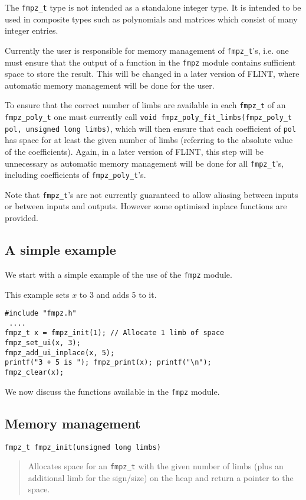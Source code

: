 \documentclass[a4paper,10pt]{article}
\newcommand{\code}{\lstinline}
\begin{document}
The \code{fmpz_t} type is not intended as a standalone integer type. It is intended to be used in composite types such as polynomials and matrices which consist of many integer entries. 

Currently the user is responsible for memory management of \code{fmpz_t}'s, i.e. one must ensure that the output of a function in the \code{fmpz} module contains sufficient space to store the result. This will be changed in a later version of FLINT, where automatic memory management will be done for the user. 

To ensure that the correct number of limbs are available in each \code{fmpz_t} of an \code{fmpz_poly_t} one must currently call \code{void fmpz_poly_fit_limbs(fmpz_poly_t pol, unsigned long limbs)}, which will then ensure that each coefficient of \code{pol} has space for at least the given number of limbs (referring to the absolute value of the coefficients). Again, in a later version of FLINT, this step will be unnecessary as automatic memory management will be done for all \code{fmpz_t}'s, including coefficients of \code{fmpz_poly_t}'s.

Note that \code{fmpz_t}'s are not currently guaranteed to allow aliasing between inputs or between inputs and outputs. However some optimised inplace functions are provided.

\subsection{A simple example}
We start with a simple example of the use of the \code{fmpz} module.

This example sets $x$ to 3 and adds 5 to it.

\begin{lstlisting}
#include "fmpz.h"
 ....
fmpz_t x = fmpz_init(1); // Allocate 1 limb of space
fmpz_set_ui(x, 3);
fmpz_add_ui_inplace(x, 5);
printf("3 + 5 is "); fmpz_print(x); printf("\n");
fmpz_clear(x);
\end{lstlisting}

We now discuss the functions available in the \code{fmpz} module.

\subsection{Memory management}

\begin{lstlisting}
fmpz_t fmpz_init(unsigned long limbs) 
\end{lstlisting}
\begin{quote}
Allocates space for an \code{fmpz_t} with the given number of limbs (plus an additional limb for the sign/size) on the heap and return a pointer to the space.
\end{quote}
\end{document}
